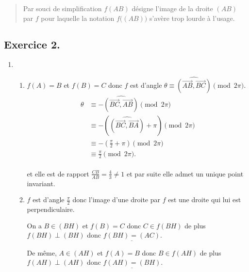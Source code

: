 \documentclass{article}
\newcommand{\angorio}[2]{\widehat{(\overrightarrow{#1}, \overrightarrow{#2})}}
\begin{document}
	\renewcommand{\abstractname}{Remarque}
\begin{abstract}
	Par souci de simplification $f(AB)$ désigne l'image de la droite $(AB)$ par $f$ pour laquelle la notation $f\Big((AB)\Big)$ s'avère trop lourde à l'usage.
\end{abstract}
\subsection*{Exercice 2.}
\begin{enumerate}
	\item \begin{enumerate}[label=(\alph*)]
		\item $ f(A)=B$ et $ f(B)=C $ donc $f$ est d'angle $\theta\equiv\angorio{AB}{BC}\pmod{2\pi}$.
		\begin{align*}
			\theta & \equiv-\angorio{BC}{AB}\pmod{2\pi}\\
			&\equiv -(\angorio{BC}{BA}+\pi)\pmod{2\pi}\\
			&\equiv -(\frac{\pi}{2}+\pi)\pmod{2\pi}\\
			&\equiv \frac{\pi}{2}\pmod{2\pi}.
		\end{align*} \\
		et elle est de rapport $\frac{CB}{AB}=\frac{4}{3}\neq1$ et par suite elle admet un unique point invariant.
		\item $f$ est d'angle $\frac{\pi}{2}$ donc l'image d'une droite par $f$ est une droite qui lui est perpendiculaire.
		
		On a $B\in(BH)$ et $f(B)=C$ donc $C\in f(BH)$ de plus $f(BH)\perp(BH)$ donc $\underline{f(BH)=(AC)}$.
		
		De même, $A\in(AH)$ et $f(A)=B$ donc $B\in f(AH)$ de plus $f(AH)\perp(AH)$ donc $\underline{f(AH)=(BH)}$.
		

\end{enumerate}
\end{enumerate}
\end{document}
